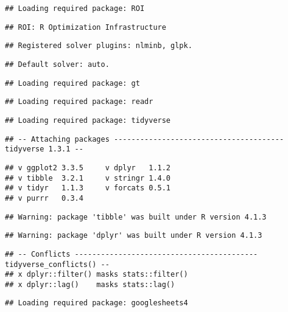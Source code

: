 \documentclass[
]{article}
\begin{document}
\begin{verbatim}
## Loading required package: ROI
\end{verbatim}

\begin{verbatim}
## ROI: R Optimization Infrastructure
\end{verbatim}

\begin{verbatim}
## Registered solver plugins: nlminb, glpk.
\end{verbatim}

\begin{verbatim}
## Default solver: auto.
\end{verbatim}

\begin{verbatim}
## Loading required package: gt
\end{verbatim}

\begin{verbatim}
## Loading required package: readr
\end{verbatim}

\begin{verbatim}
## Loading required package: tidyverse
\end{verbatim}

\begin{verbatim}
## -- Attaching packages --------------------------------------- tidyverse 1.3.1 --
\end{verbatim}

\begin{verbatim}
## v ggplot2 3.3.5     v dplyr   1.1.2
## v tibble  3.2.1     v stringr 1.4.0
## v tidyr   1.1.3     v forcats 0.5.1
## v purrr   0.3.4
\end{verbatim}

\begin{verbatim}
## Warning: package 'tibble' was built under R version 4.1.3
\end{verbatim}

\begin{verbatim}
## Warning: package 'dplyr' was built under R version 4.1.3
\end{verbatim}

\begin{verbatim}
## -- Conflicts ------------------------------------------ tidyverse_conflicts() --
## x dplyr::filter() masks stats::filter()
## x dplyr::lag()    masks stats::lag()
\end{verbatim}

\begin{verbatim}
## Loading required package: googlesheets4
\end{verbatim}
\end{document}
